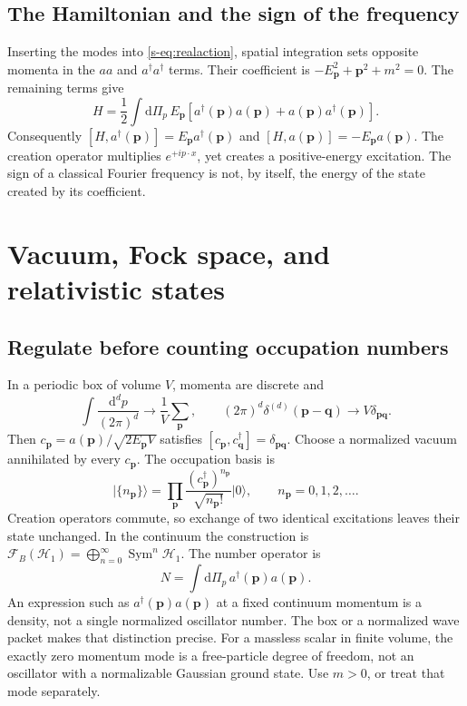 \documentclass[11pt]{article}
\newcommand{\dd}{\mathrm{d}}
\newcommand{\cH}{\mathcal H}
\newcommand{\vac}{\lvert0\rangle}
\begin{document}
\subsection{The Hamiltonian and the sign of the frequency}
Inserting the modes into \eqref{s-eq:realaction}, spatial integration sets
opposite momenta in the \(aa\) and \(a^\dagger a^\dagger\) terms.
Their coefficient is \(-E_{\bm p}^2+\bm p^2+m^2=0\). The remaining terms give
\begin{equation}
 H=\frac12\int\dd\Pi_p\,E_{\bm p}
 [a^\dagger(\bm p)a(\bm p)+a(\bm p)a^\dagger(\bm p)].
 \label{s-eq:Hsym}
\end{equation}
Consequently \([H,a^\dagger(\bm p)]=E_{\bm p}a^\dagger(\bm p)\) and
\([H,a(\bm p)]=-E_{\bm p}a(\bm p)\). The creation operator multiplies
\(e^{+ip\cdot x}\), yet creates a positive-energy excitation. The sign
of a classical Fourier frequency is not, by itself, the energy of the
state created by its coefficient.

\section{Vacuum, Fock space, and relativistic states}
\subsection{Regulate before counting occupation numbers}
In a periodic box of volume \(V\), momenta are discrete and
\[
 \int\frac{\dd^d p}{(2\pi)^d}\longrightarrow\frac1V\sum_{\bm p},
 \qquad (2\pi)^d\delta^{(d)}(\bm p-\bm q)\longrightarrow V\delta_{\bm p\bm q}.
\]
Then \(c_{\bm p}=a(\bm p)/\sqrt{2E_{\bm p}V}\) satisfies
\([c_{\bm p},c_{\bm q}^\dagger]=\delta_{\bm p\bm q}\). Choose a normalized
vacuum annihilated by every \(c_{\bm p}\). The occupation basis is
\begin{equation}
 |\{n_{\bm p}\}\rangle=\prod_{\bm p}
 \frac{(c_{\bm p}^\dagger)^{n_{\bm p}}}{\sqrt{n_{\bm p}!}}\vac,
 \qquad n_{\bm p}=0,1,2,\ldots.
 \label{s-eq:fock}
\end{equation}
Creation operators commute, so exchange of two identical excitations
leaves their state unchanged. In the continuum the construction is
\(\mathcal F_B(\cH_1)=\bigoplus_{n=0}^{\infty}\operatorname{Sym}^n\cH_1\).
The number operator is
\begin{equation}
 N=\int\dd\Pi_p\,a^\dagger(\bm p)a(\bm p).
 \label{s-eq:N}
\end{equation}
An expression such as \(a^\dagger(\bm p)a(\bm p)\) at a fixed continuum
momentum is a density, not a single normalized oscillator number.
The box or a normalized wave packet makes that distinction precise.
For a massless scalar in finite volume, the exactly zero momentum mode
is a free-particle degree of freedom, not an oscillator with a normalizable
Gaussian ground state. Use \(m>0\), or treat that mode separately.
\end{document}
